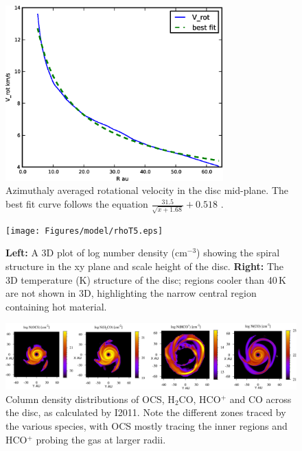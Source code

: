 \documentclass[useAMS,usenatbib]{mn2e}
\begin{document}
\begin{figure}
 \includegraphics[width=84mm]{Figures/model/rotational_velocities.eps}
 \caption{Azimuthaly averaged rotational velocity in the disc mid-plane. The best fit curve follows the equation $\frac{31.5}{\sqrt{x+1.68}}+0.518$ .}
 \label{velocity}
\end{figure}

\begin{figure}
 \texttt{[image: Figures/model/rhoT5.eps]}
 \caption{{\bf Left:} A 3D plot of log number density (cm$^{-3}$) showing the spiral structure in the xy plane and scale height of the disc. {\bf Right:} The 3D temperature (K) structure of the disc; regions cooler than 40$\,$K are not shown in 3D, highlighting the narrow central region containing hot material.}
 \label{rhoT} 
\end{figure}

\begin{figure}
 \includegraphics[width=168mm]{Figures/model/columnDensities3.eps}
 \caption{Column density distributions of OCS, H$_2$CO, HCO$^+$ and CO across the disc, as calculated by I2011. Note the different zones traced by the various species, with OCS mostly tracing the inner regions and HCO$^+$ probing the gas at larger radii.}
 \label{Chemistry} 
\end{figure}
\end{document}
